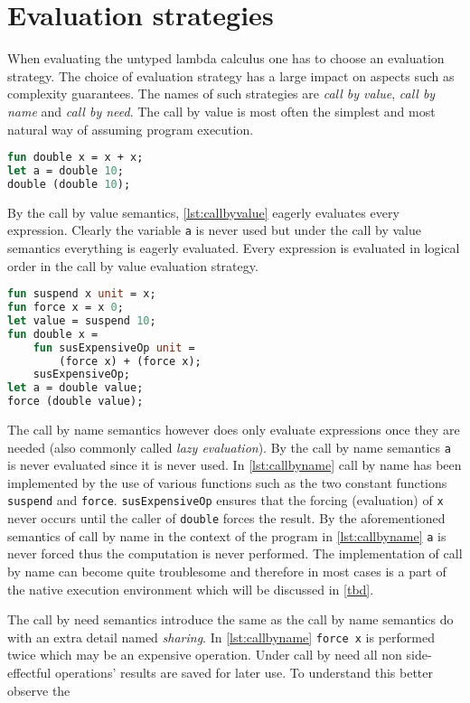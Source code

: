 \documentclass[11pt,oneside,a4paper]{report}
\begin{document}
\section{Evaluation strategies}
When evaluating the untyped lambda calculus one has to choose an evaluation strategy.
The choice of evaluation strategy has a large impact on aspects such as complexity guarantees.
The names of such strategies are \textit{call by value}, \textit{call by name} and \textit{call by need}.
The call by value is most often the simplest and most natural way of assuming program execution.
\begin{lstlisting}[language=ML,caption={Program that doubles values},label={lst:callbyvalue},mathescape=true]
fun double x = x + x;
let a = double 10;
double (double 10);
\end{lstlisting}
By the call by value semantics, \autoref{lst:callbyvalue} eagerly evaluates every expression.
Clearly the variable \texttt{a} is never used but under the call by value semantics everything is eagerly evaluated.
Every expression is evaluated in logical order in the call by value evaluation strategy.
\begin{lstlisting}[language=ML,caption={Implementation of call by name},label={lst:callbyname},mathescape=true]
fun suspend x unit = x;
fun force x = x 0;
let value = suspend 10;
fun double x = 
    fun susExpensiveOp unit = 
        (force x) + (force x);
    susExpensiveOp;
let a = double value;
force (double value);
\end{lstlisting}

The call by name semantics however does only evaluate expressions once they are needed (also commonly called \textit{lazy evaluation}).
By the call by name semantics \texttt{a} is never evaluated since it is never used.
In \autoref{lst:callbyname} call by name has been implemented by the use of various functions such as the two constant functions \texttt{suspend} and \texttt{force}.
\texttt{susExpensiveOp} ensures that the forcing (evaluation) of \texttt{x} never occurs until the caller of \texttt{double} forces the result.
By the aforementioned semantics of call by name in the context of the program in \autoref{lst:callbyname} \texttt{a} is never forced thus the computation is never performed.
The implementation of call by name can become quite troublesome and therefore in most cases is a part of the native execution environment which will be discussed in \autoref{tbd}.

The call by need semantics introduce the same as the call by name semantics do with an extra detail named \textit{sharing}.
In \autoref{lst:callbyname} \texttt{force x} is performed twice which may be an expensive operation.
Under call by need all non side-effectful operations' results are saved for later use.
To understand this better observe the 
\end{document}
